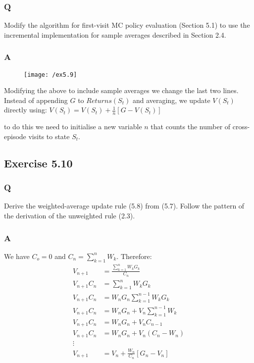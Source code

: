 \subsubsection{Q}
Modify the algorithm for first-visit MC policy evaluation (Section 5.1) to use the incremental implementation for sample averages described in Section 2.4. 
\subsubsection{A}
\begin{figure}[h!]
	\centering
	\texttt{[image: /ex5.9]}
	\label{fig:monte carlo policy eval}
\end{figure}

Modifying the above to include sample averages we change the last two lines. Instead of appending $G$ to $Returns(S_t)$ and averaging, we update $V(S_t)$ directly using:
$
V(S_t) = V(S_t) + \frac{1}{n}\left[G - V(S_t)\right]
$

to do this we need to initialise a new variable $n$ that counts the number of cross-episode visits to state $S_t$.

\subsection{Exercise 5.10}
\subsubsection{Q}
Derive the weighted-average update rule (5.8) from (5.7). Follow the pattern of the derivation of the unweighted rule (2.3).
\subsubsection{A}
We have $C_o = 0$ and $C_n = \sum_{k=1}^{n} W_k$. Therefore:
\begin{align}
V_{n+1} &= \frac{\sum_{k=1}^{n}W_k G_k}{C_n}\\
V_{n+1}{C_n} &= \sum_{k=1}^{n}W_k G_k \\
V_{n+1}{C_n} &= W_n G_n \sum_{k=1}^{n-1}W_k G_k \\
V_{n+1}{C_n} &= W_n G_n + V_n \sum_{k=1}^{n-1}W_k \\
V_{n+1}{C_n} &= W_n G_n + V_n C_{n-1} \\
V_{n+1}{C_n} &= W_n G_n + V_n \left(C_n - W_n\right) \\
\vdots \\
V_{n+1} &= V_n + \frac{W_n}{C_n}\left[G_n - V_n\right] \\
\end{align}

